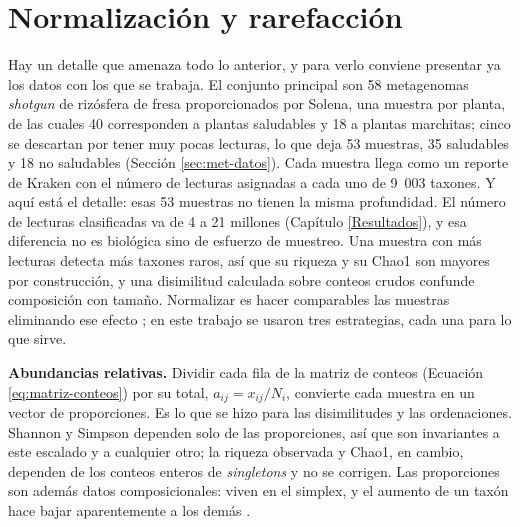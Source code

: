 \section{Normalización y rarefacción}
\label{sec:normalizacion}

Hay un detalle que amenaza todo lo anterior, y para verlo conviene presentar ya los datos con los
que se trabaja. El conjunto principal son 58 metagenomas \emph{shotgun} de rizósfera de fresa
proporcionados por Solena, una muestra por planta, de las cuales 40 corresponden a plantas
saludables y 18 a plantas marchitas; cinco se descartan por tener muy pocas lecturas, lo que deja
53 muestras, 35 saludables y 18 no saludables (Sección \ref{sec:met-datos}). Cada muestra llega
como un reporte de Kraken con el número de lecturas asignadas a cada uno de 9~003 taxones. Y aquí
está el detalle: esas 53 muestras no tienen la misma profundidad. El número de lecturas
clasificadas va de 4 a 21 millones (Capítulo \ref{Resultados}), y esa diferencia no es biológica
sino de esfuerzo de muestreo. Una muestra con más lecturas detecta más taxones raros, así que su
riqueza y su Chao1 son mayores por construcción, y una disimilitud calculada sobre conteos crudos
confunde composición con tamaño. Normalizar es hacer comparables las muestras eliminando ese
efecto \citep{mcmurdie2014waste, weiss2017normalization}; en este trabajo se usaron tres estrategias,
cada una para lo que sirve.

\textbf{Abundancias relativas.} Dividir cada fila de la matriz de conteos
(Ecuación \ref{eq:matriz-conteos}) por su total, $a_{ij} = x_{ij} / N_i$, convierte cada muestra en
un vector de proporciones. Es lo que se hizo para las disimilitudes y las ordenaciones. Shannon y
Simpson dependen solo de las proporciones, así que son invariantes a este escalado y a cualquier
otro; la riqueza observada y Chao1, en cambio, dependen de los conteos enteros de \emph{singletons}
y no se corrigen. Las proporciones son además datos composicionales: viven en el simplex, y el aumento
de un taxón hace bajar aparentemente a los demás \citep{gloor2017microbiome}.

